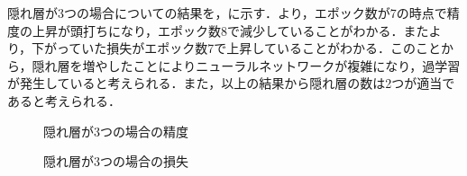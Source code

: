 \documentclass{eithesis}
\begin{document}
	隠れ層が3つの場合についての結果を，に示す．より，エポック数が7の時点で精度の上昇が頭打ちになり，エポック数8で減少していることがわかる．またより，下がっていた損失がエポック数7で上昇していることがわかる．このことから，隠れ層を増やしたことによりニューラルネットワークが複雑になり，過学習が発生していると考えられる．また，以上の結果から隠れ層の数は2つが適当であると考えられる．
	\begin{figure}[htbp]
		\centering
		\caption{隠れ層が3つの場合の精度}
		\label{fig_hidden3_acc}
	\end{figure}
	\begin{figure}[htbp]
		\centering
		\caption{隠れ層が3つの場合の損失}
		\label{fig_hidden3_loss}
	\end{figure}
\end{document}
